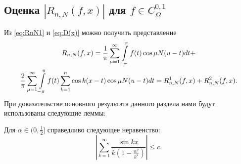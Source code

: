 \subsection{Оценка $|R_{n,N}(f,x)|$ для $f \in C^{0,1}_\Omega$}
Из  \eqref{eq:RnN1} и \eqref{eq:D(x)} можно получить представление
\begin{multline*}
R_{n,N}(f,x)=\frac{1}{\pi}\sum_{\mu=1}^{\infty}\intop_{-\pi}^{\pi}f(t)\cos\mu N(u-t)dt+\\
\frac{2}{\pi}\sum_{\mu=1}^{\infty}\intop_{-\pi}^{\pi}f(t)\sum_{k=1}^{n}\cos k(x-t) \cos \mu N(u-t)dt=
R_{n,N}^{1}(f,x)+R_{n,N}^{2}(f,x).
\end{multline*}
При доказательстве основного результата данного раздела нами будут использованы следующие леммы:
\begin{lemma} \label{sum_sin_kx2_with_alpha}
	Для $\alpha \in (0, \frac{1}{2}]$ справедливо следующее неравенство:
	\begin{equation*}
	\left|
	\sum_{k=1}^{\infty} \frac{\sin kx}{k\left(1-\frac{\alpha^2}{k^2}\right)}
	\right|
	\leq
	c.
	\end{equation*}
\end{lemma}

